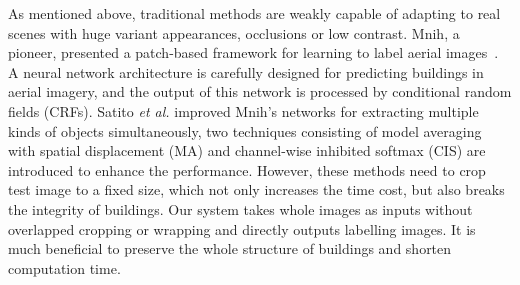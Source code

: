 As mentioned above, traditional methods are weakly capable of adapting to real scenes with huge variant appearances, occlusions or low contrast. 
Mnih, a pioneer, presented a patch-based framework for learning to label aerial images~\cite{Mnih2013Machine}. 
A neural network architecture is carefully designed for predicting buildings in aerial imagery, and the output of this network is processed by conditional random fields (CRFs). Satito \textit{et al.} \cite{Saito2016Multiple} improved Mnih's networks for extracting multiple kinds of objects simultaneously, two techniques consisting of model averaging with spatial displacement (MA) and channel-wise inhibited softmax (CIS) are introduced to enhance the  performance. However, these methods need to crop test image to a fixed size, which not only increases the time cost, but also breaks the integrity of buildings. Our system takes whole images as inputs without overlapped cropping or wrapping and directly outputs labelling images. It is much beneficial  to preserve the whole structure of buildings and shorten computation time.



